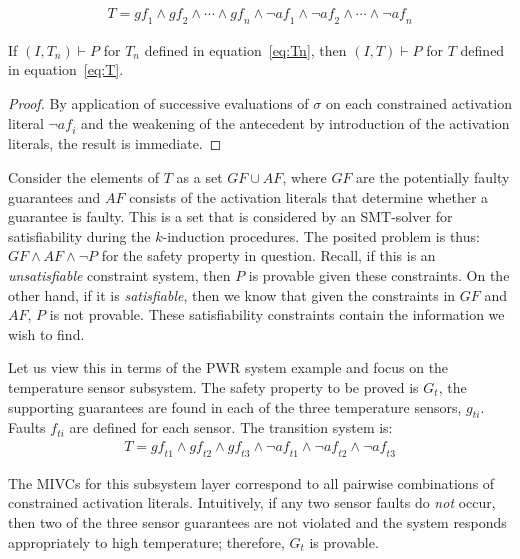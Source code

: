 \begin{gather}
T = \mathit{gf}_1 \land \mathit{gf}_2 \land \cdots \land \mathit{gf}_n \land \neg \mathit{af}_1 \land \neg \mathit{af}_2 \land \cdots \land \neg \mathit{af}_n
\label{eq:T}
\end{gather}

\begin{theorem} If $(I,T_n) \vdash P$ for $T_n$ defined in equation~\ref{eq:Tn}, then $(I,T) \vdash P$ for $T$ defined in equation~\ref{eq:T}.
\begin{proof}
By application of successive evaluations of $\sigma$ on each constrained activation literal $\neg \mathit{af}_i$ and the weakening of the antecedent by introduction of the activation literals, the result is immediate.
\end{proof}
\end{theorem}

Consider the elements of $T$ as a set $GF \cup AF$, where $GF$ are the potentially faulty guarantees and $AF$ consists of the activation literals that determine whether a guarantee is faulty. This is a set that is considered by an SMT-solver for satisfiability during the $k$-induction procedures. The posited problem is thus: $GF \land AF \land \neg P$ for the safety property in question. Recall, if this is an \emph{unsatisfiable} constraint system, then $P$ is provable given these constraints. On the other hand, if it is \emph{satisfiable}, then we know that given the constraints in $GF$ and $AF$, $P$ is not provable. These satisfiability constraints contain the information we wish to find. 

Let us view this in terms of the PWR system example and focus on the temperature sensor subsystem. The safety property to be proved is $G_t$, the supporting guarantees are found in each of the three temperature sensors, $g_{ti}$. Faults $f_{ti}$ are defined for each sensor. The transition system is: 
\begin{gather*}
T = \mathit{gf}_{t1} \land \mathit{gf}_{t2} \land \mathit{gf}_{t3}  \land \neg \mathit{af}_{t1} \land \neg \mathit{af}_{t2} \land \neg \mathit{af}_{t3}
\end{gather*}

The MIVCs for this subsystem layer correspond to all pairwise combinations of constrained activation literals. Intuitively, if any two sensor faults do {\em not} occur, then two of the three sensor guarantees are not violated and the system responds appropriately to high temperature; therefore, $G_t$ is provable. 

